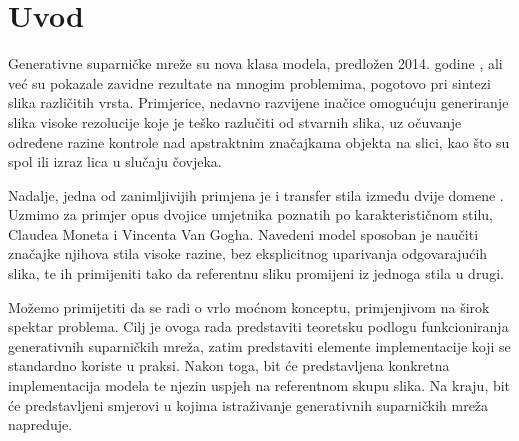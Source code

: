 \chapter{Uvod}
Generativne suparničke mreže su nova klasa modela, predložen 2014. godine , ali već su pokazale zavidne rezultate na mnogim problemima, pogotovo pri sintezi slika različitih vrsta. Primjerice, nedavno razvijene inačice  omogućuju generiranje slika visoke rezolucije koje je teško razlučiti od stvarnih slika, uz očuvanje određene razine kontrole nad apstraktnim značajkama objekta na slici, kao što su spol ili izraz lica u slučaju čovjeka. 

Nadalje, jedna od zanimljivijih primjena je i transfer stila između dvije domene . Uzmimo za primjer opus dvojice umjetnika poznatih po karakterističnom stilu, Claudea Moneta i Vincenta Van Gogha. Navedeni model sposoban je naučiti značajke njihova stila visoke razine, bez eksplicitnog uparivanja odgovarajućih slika, te ih primijeniti tako da referentnu sliku promijeni iz jednoga stila u drugi.

Možemo primijetiti da se radi o vrlo moćnom konceptu, primjenjivom na širok spektar problema. Cilj je ovoga rada predstaviti teoretsku podlogu funkcioniranja generativnih suparničkih mreža, zatim predstaviti elemente implementacije koji se standardno koriste u praksi. Nakon toga, bit će predstavljena konkretna implementacija modela te njezin uspjeh na referentnom skupu slika. Na kraju, bit će predstavljeni smjerovi u kojima istraživanje generativnih suparničkih mreža napreduje.

